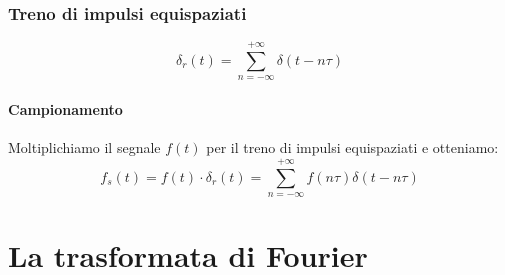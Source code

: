 \documentclass[12pt, a4paper]{report}
\begin{document}
\subsection{Treno di impulsi equispaziati}
\begin{equation*}
    \delta_{r}(t) = \sum_{n=-\infty}^{+\infty} \delta(t-n\tau)
\end{equation*}
\subsubsection{Campionamento}
Moltiplichiamo il segnale $f(t)$ per il treno di impulsi equispaziati e otteniamo:
\begin{equation*}
    f_{s}(t) = f(t) \cdot \delta_{r}(t) = \sum_{n=-\infty}^{+\infty} f(n\tau) \delta(t-n\tau)
\end{equation*}
\chapter{La trasformata di Fourier}
\end{document}
